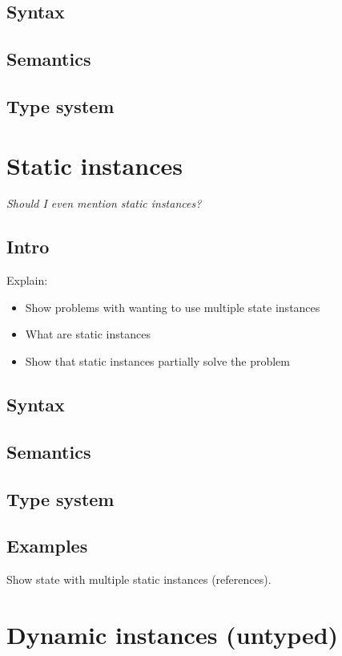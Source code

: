 {\subsection{Syntax}

\subsection{Semantics}

\subsection{Type system}

\newpage
\section{Static instances}

\textit{Should I even mention static instances?}

\subsection{Intro}
Explain:
\begin{itemize}
	\item Show problems with wanting to use multiple state instances
	\item What are static instances
	\item Show that static instances partially solve the problem
\end{itemize}

\subsection{Syntax}

\subsection{Semantics}

\subsection{Type system}

\subsection{Examples}
Show state with multiple static instances (references).

\newpage
\section{Dynamic instances (untyped)}

}
